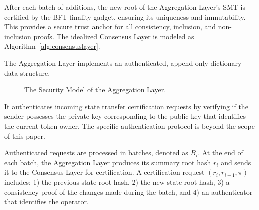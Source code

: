 \documentclass[twocolumn]{article}
\begin{document}
After each batch of additions, the new root of the Aggregation Layer's SMT is certified by the BFT finality gadget, ensuring its uniqueness and immutability. This provides a secure trust anchor for all consistency, inclusion, and non-inclusion proofs. The idealized Consensus Layer is modeled as Algorithm~\ref{alg:consensuslayer}.


The Aggregation Layer implements an authenticated, append-only dictionary data structure.

\begin{figure}[!htbp]
    \centering
{}
    \caption{The Security Model of the Aggregation Layer.}\label{fig:model}
\end{figure}

It authenticates incoming state transfer certification requests by verifying if the sender possesses the private key corresponding to the public key that identifies the current token owner. The specific authentication protocol is beyond the scope of this paper.

Authenticated requests are processed in batches, denoted as $B_i$. At the end of each batch, the Aggregation Layer produces its summary root hash $r_i$ and sends it to the Consensus Layer for certification. A certification request $(r_i, r_{i-1}, \pi)$ includes: 1) the previous state root hash, 2) the new state root hash, 3) a consistency proof of the changes made during the batch, and 4) an authenticator that identifies the operator.
\end{document}
